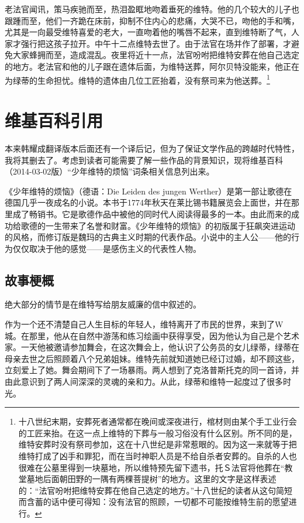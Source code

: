 \documentclass[12pt,oneside]{book}
\begin{document}
\begin{framed}
老法官闻讯，策马疾驰而至，热泪盈眶地吻着垂死的维特。他的几个较大的儿子也跟踵而至，他们一齐跪在床前，抑制不住内心的悲痛，大哭不已，吻他的手和嘴，尤其是一向最受维特喜爱的老大，一直吻着他的嘴唇不起来，直到维特断了气，人家才强行把这孩子拉开。中午十二点维特去世了。由于法官在场并作了部署，才避免大家蜂拥而至，造成混乱。夜里将近十一点，法官吩咐把维特安葬在他自己选定的地方。老法官和他的儿子跟在遗体后面，为维特送葬，阿尔贝特没能来，他正在为绿蒂的生命担忧。维特的遗体由几位工匠抬着，没有祭司来为他送葬。\footnote{十八世纪末期，安葬死者通常都在晚间或深夜进行，棺材则由某个手工业行会的工匠来抬。在这一点上维特的下葬与一般习俗没有什么区别。所不同的是，维特安葬时没有祭司参加，这在十八世纪是非常惹眼的。因为这一来就等于把维特打成了凶手和罪犯，而在当时神职人员是不给自杀者安葬的。自杀的人也很难在公墓里得到一块墓地，所以维特预先留下遗书，托Ｓ法官将他葬在“教堂墓地后面朝田野的一隅有两棵菩提树”的地方。这里的文字是这样表述的：“法官吩咐把维特安葬在他自己选定的地方。”十八世纪的读者从这句简短而含蓄的话中便可得知：没有法官的照顾，一切都不可能按维特生前的愿望进行。}
\end{framed}


\part{维基百科引用}
\label{sec-6}
本来韩耀成翻译版本后面还有一个译后记，但为了保证文学作品的跨越时代特性，我将其删去了。考虑到读者可能需要了解一些作品的背景知识，现将维基百科（2014-03-02版）“少年维特的烦恼”词条相关信息列出来。

《少年维特的烦恼》（德语：Die Leiden des jungen Werther）是第一部让歌德在德国几乎一夜成名的小说。本书于1774年秋天在莱比锡书籍展览会上面世，并在那里成了畅销书。它是歌德作品中被他的同时代人阅读得最多的一本。由此而来的成功给歌德的一生带来了名誉和财富。《少年维特的烦恼》的初版属于狂飙突进运动的风格，而修订版是魏玛的古典主义时期的代表作品。小说中的主人公——他的行为仅仅取决于他的感觉——是感伤主义的代表性人物。

\chapter{故事梗概}
\label{sec-6-1}
绝大部分的情节是在维特写给朋友威廉的信中叙述的。

作为一个还不清楚自己人生目标的年轻人，维特离开了市民的世界，来到了W城。在那里，他从在自然中游荡和练习绘画中获得享受，因为他认为自己是个艺术家。一天他被邀请参加舞会，在这次舞会上，他认识了公务员的女儿绿蒂，绿蒂在母亲去世之后照顾着八个兄弟姐妹。维特先前就知道她已经订过婚，却不顾这些，立刻爱上了她。舞会期间下了一场暴雨。两人想到了克洛普斯托克的同一首诗，并由此意识到了两人间深深的灵魂的亲和力。从此，绿蒂和维特一起度过了很多时光。
\end{document}
